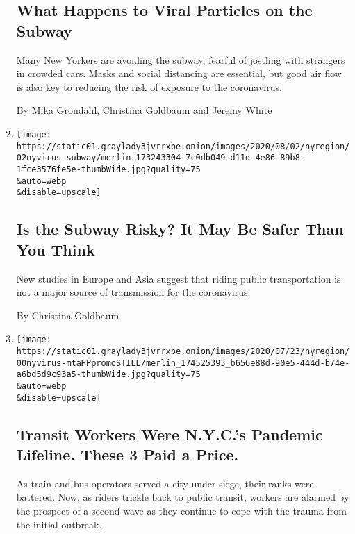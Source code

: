 \begin{enumerate}
  \hypertarget{what-happens-to-viral-particles-on-the-subway}{%
  \subsection{What Happens to Viral Particles on the
  Subway}\label{what-happens-to-viral-particles-on-the-subway}}

  Many New Yorkers are avoiding the subway, fearful of jostling with
  strangers in crowded cars. Masks and social distancing are essential,
  but good air flow is also key to reducing the risk of exposure to the
  coronavirus.

  By Mika Gröndahl, Christina Goldbaum and Jeremy White
\item
  \href{/2020/08/02/nyregion/nyc-subway-coronavirus-safety.html}{}

  \texttt{[image: https://static01.graylady3jvrrxbe.onion/images/2020/08/02/nyregion/02nyvirus-subway/merlin\_173243304\_7c0db049-d11d-4e86-89b8-1fce3576fe5e-thumbWide.jpg?quality=75\\\&auto=webp\\\&disable=upscale]}

  \hypertarget{is-the-subway-risky-it-may-be-safer-than-you-think}{%
  \subsection{Is the Subway Risky? It May Be Safer Than You
  Think}\label{is-the-subway-risky-it-may-be-safer-than-you-think}}

  New studies in Europe and Asia suggest that riding public
  transportation is not a major source of transmission for the
  coronavirus.

  By Christina Goldbaum
\item
  \href{/interactive/2020/07/26/nyregion/nyc-covid-19-mta-transit-workers.html}{}

  \texttt{[image: https://static01.graylady3jvrrxbe.onion/images/2020/07/23/nyregion/00nyvirus-mtaHPpromoSTILL/merlin\_174525393\_b656e88d-90e5-444d-b74e-a6bd5d9c93a5-thumbWide.jpg?quality=75\\\&auto=webp\\\&disable=upscale]}

  \hypertarget{transit-workers-were-nycs-pandemic-lifeline-these-3-paid-a-price}{%
  \subsection{Transit Workers Were N.Y.C.'s Pandemic Lifeline. These 3
  Paid a
  Price.}\label{transit-workers-were-nycs-pandemic-lifeline-these-3-paid-a-price}}

  As train and bus operators served a city under siege, their ranks were
  battered. Now, as riders trickle back to public transit, workers are
  alarmed by the prospect of a second wave as they continue to cope with
  the trauma from the initial outbreak.


\end{enumerate}
